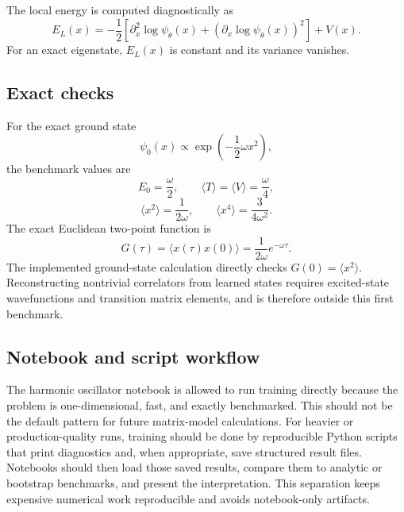 \documentclass[11pt]{article}
\begin{document}
The local energy is computed diagnostically as
\begin{equation}
  E_L(x)
  =
  -\frac{1}{2}
  \left[
    \partial_x^2\log\psi_\theta(x)
    +
    \left(\partial_x\log\psi_\theta(x)\right)^2
  \right]
  + V(x).
\end{equation}
For an exact eigenstate, \(E_L(x)\) is constant and its variance vanishes.

\subsection{Exact checks}

For the exact ground state
\begin{equation}
  \psi_0(x) \propto \exp\left(-\frac{1}{2}\omega x^2\right),
\end{equation}
the benchmark values are
\begin{equation}
  E_0=\frac{\omega}{2},\qquad
  \langle T\rangle=\langle V\rangle=\frac{\omega}{4},
\end{equation}
\begin{equation}
  \langle x^2\rangle=\frac{1}{2\omega},
  \qquad
  \langle x^4\rangle=\frac{3}{4\omega^2}.
\end{equation}
The exact Euclidean two-point function is
\begin{equation}
  G(\tau)=\langle x(\tau)x(0)\rangle
  =\frac{1}{2\omega}e^{-\omega\tau}.
\end{equation}
The implemented ground-state calculation directly checks \(G(0)=\langle
x^2\rangle\).  Reconstructing nontrivial correlators from learned states
requires excited-state wavefunctions and transition matrix elements, and is
therefore outside this first benchmark.

\subsection{Notebook and script workflow}

The harmonic oscillator notebook is allowed to run training directly because
the problem is one-dimensional, fast, and exactly benchmarked.  This should not
be the default pattern for future matrix-model calculations.  For heavier or
production-quality runs, training should be done by reproducible Python scripts
that print diagnostics and, when appropriate, save structured result files.
Notebooks should then load those saved results, compare them to analytic or
bootstrap benchmarks, and present the interpretation.  This separation keeps
expensive numerical work reproducible and avoids notebook-only artifacts.
\end{document}
